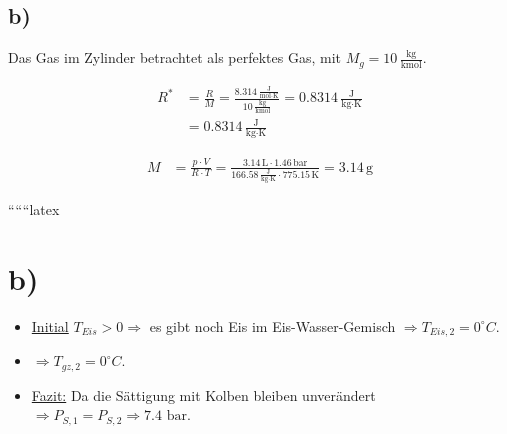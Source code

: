 

\subsection*{b)}

Das Gas im Zylinder betrachtet als perfektes Gas, mit $M_g = 10 \, \frac{\text{kg}}{\text{kmol}}$.

\begin{align*}
R^* &= \frac{R}{M} = \frac{8.314 \, \frac{\text{J}}{\text{mol} \cdot \text{K}}}{10 \, \frac{\text{kg}}{\text{kmol}}} = 0.8314 \, \frac{\text{J}}{\text{kg} \cdot \text{K}} \\
    &= 0.8314 \, \frac{\text{J}}{\text{kg} \cdot \text{K}}
\end{align*}

\begin{align*}
M &= \frac{p \cdot V}{R \cdot T} = \frac{3.14 \, \text{L} \cdot 1.46 \, \text{bar}}{166.58 \, \frac{\text{J}}{\text{kg} \cdot \text{K}} \cdot 775.15 \, \text{K}} = 3.14 \, \text{g}
\end{align*}

``````latex



\section*{b)}

\begin{itemize}
    \item \underline{Initial} $T_{Eis} > 0 \Rightarrow$ es gibt noch Eis im Eis-Wasser-Gemisch $\Rightarrow T_{Eis,2} = 0^\circ C$.
    \item $\Rightarrow T_{gz,2} = 0^\circ C$.
    \item \underline{Fazit:} Da die Sättigung mit Kolben bleiben unverändert $\Rightarrow P_{S,1} = P_{S,2} \Rightarrow 7.4 \text{ bar}$.
\end{itemize}